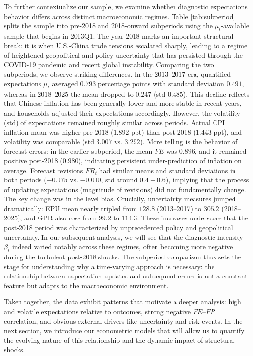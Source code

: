 \documentclass[12pt]{article}
\begin{document}
To further contextualize our sample, we examine whether diagnostic expectations behavior differs across distinct macroeconomic regimes. Table \ref{tab:subperiod} splits the sample into pre-2018 and 2018-onward subperiods using the $\mu_t$-available sample that begins in 2013Q1. The year 2018 marks an important structural break: it is when U.S.-China trade tensions escalated sharply, leading to a regime of heightened geopolitical and policy uncertainty that has persisted through the COVID-19 pandemic and recent global instability. Comparing the two subperiods, we observe striking differences. In the 2013--2017 era, quantified expectations $\mu_t$ averaged $0.793$ percentage points with standard deviation $0.491$, whereas in 2018--2025 the mean dropped to $0.247$ (std $0.485$). This decline reflects that Chinese inflation has been generally lower and more stable in recent years, and households adjusted their expectations accordingly. However, the volatility (std) of expectations remained roughly similar across periods. Actual CPI inflation mean was higher pre-2018 ($1.892$ ppt) than post-2018 ($1.443$ ppt), and volatility was comparable (std $3.007$ vs. $3.292$). More telling is the behavior of forecast errors: in the earlier subperiod, the mean $FE$ was $0.896$, and it remained positive post-2018 ($0.980$), indicating persistent under-prediction of inflation on average. Forecast revisions $FR_t$ had similar means and standard deviations in both periods ($-0.075$ vs. $-0.010$, std around $0.4-0.6$), implying that the process of updating expectations (magnitude of revisions) did not fundamentally change. The key change was in the level bias. Crucially, uncertainty measures jumped dramatically: EPU mean nearly tripled from $128.8$ (2013--2017) to $305.2$ (2018--2025), and GPR also rose from $99.2$ to $114.3$. These increases underscore that the post-2018 period was characterized by unprecedented policy and geopolitical uncertainty. In our subsequent analysis, we will see that the diagnostic intensity $\beta_t$ indeed varied notably across these regimes, often becoming more negative during the turbulent post-2018 shocks. The subperiod comparison thus sets the stage for understanding why a time-varying approach is necessary: the relationship between expectation updates and subsequent errors is not a constant feature but adapts to the macroeconomic environment.

Taken together, the data exhibit patterns that motivate a deeper analysis: high and volatile expectations relative to outcomes, strong negative $FE$--$FR$ correlation, and obvious external drivers like uncertainty and risk events. In the next section, we introduce our econometric models that will allow us to quantify the evolving nature of this relationship and the dynamic impact of structural shocks.
\end{document}
